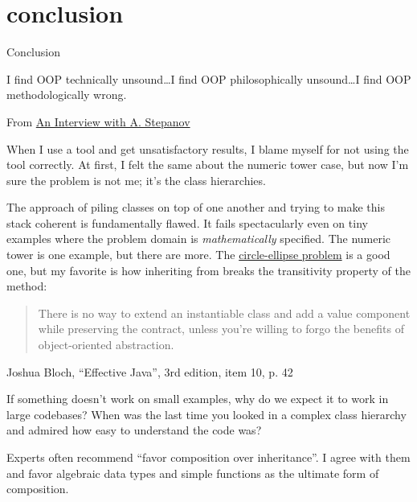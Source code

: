 \documentclass{article}
\begin{document}
\section{conclusion}{Conclusion}

\epigraph{I find OOP technically unsound\ldots  I find OOP philosophically unsound\ldots  I find OOP methodologically wrong.}{From \href{http://stlport.org/resources/StepanovUSA.html}{An Interview with A. Stepanov}}

When I use a tool and get unsatisfactory results, I blame myself for not using the tool correctly.
At first, I felt the same about the numeric tower case, but now I'm sure the problem is not me; it's the class hierarchies.

The approach of piling classes on top of one another and trying to make this stack coherent is fundamentally flawed.
It fails spectacularly even on tiny examples where the problem domain is \emph{mathematically} specified.
The numeric tower is one example, but there are more.
The \href{https://en.wikipedia.org/wiki/Circle%E2%80%93ellipse_problem}{circle-ellipse problem} is a good one,
but my favorite is how inheriting  from  breaks the transitivity property of the  method:

\blockquote{
    There is no way to extend an instantiable class and add a value component while preserving the  contract,
    unless you're willing to forgo the benefits of object-oriented abstraction.
}{Joshua Bloch, ``Effective Java'', 3rd edition, item 10, p. 42}

If something doesn't work on small examples, why do we expect it to work in large codebases?
When was the last time you looked in a complex class hierarchy and admired how easy to understand the code was?

Experts often recommend ``favor composition over inheritance''.
I agree with them and favor algebraic data types and simple functions as the ultimate form of composition.
\end{document}
